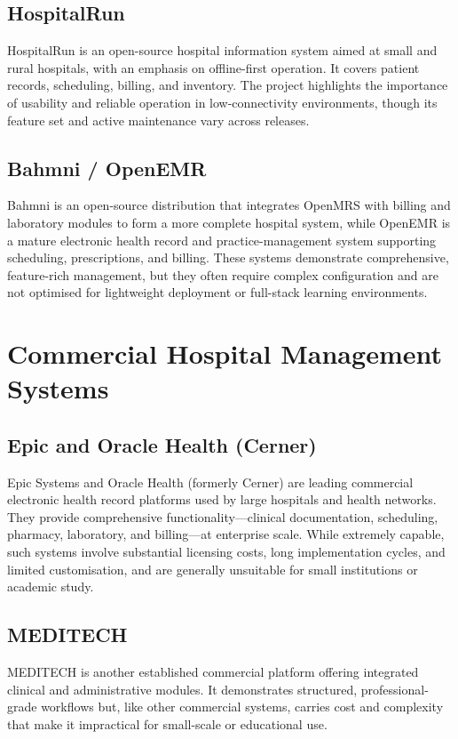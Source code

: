 \documentclass[12pt,a4paper]{report}
\begin{document}
\subsection*{HospitalRun}
HospitalRun is an open-source hospital information system aimed at small and rural
hospitals, with an emphasis on offline-first operation. It covers patient records,
scheduling, billing, and inventory. The project highlights the importance of usability
and reliable operation in low-connectivity environments, though its feature set and
active maintenance vary across releases.

\subsection*{Bahmni / OpenEMR}
Bahmni is an open-source distribution that integrates OpenMRS with billing and
laboratory modules to form a more complete hospital system, while OpenEMR is a mature
electronic health record and practice-management system supporting scheduling,
prescriptions, and billing. These systems demonstrate comprehensive, feature-rich
management, but they often require complex configuration and are not optimised for
lightweight deployment or full-stack learning environments.

\section{Commercial Hospital Management Systems}

\subsection*{Epic and Oracle Health (Cerner)}
Epic Systems and Oracle Health (formerly Cerner) are leading commercial electronic
health record platforms used by large hospitals and health networks. They provide
comprehensive functionality---clinical documentation, scheduling, pharmacy, laboratory,
and billing---at enterprise scale. While extremely capable, such systems involve
substantial licensing costs, long implementation cycles, and limited customisation, and
are generally unsuitable for small institutions or academic study.

\subsection*{MEDITECH}
MEDITECH is another established commercial platform offering integrated clinical and
administrative modules. It demonstrates structured, professional-grade workflows but,
like other commercial systems, carries cost and complexity that make it impractical for
small-scale or educational use.
\end{document}
